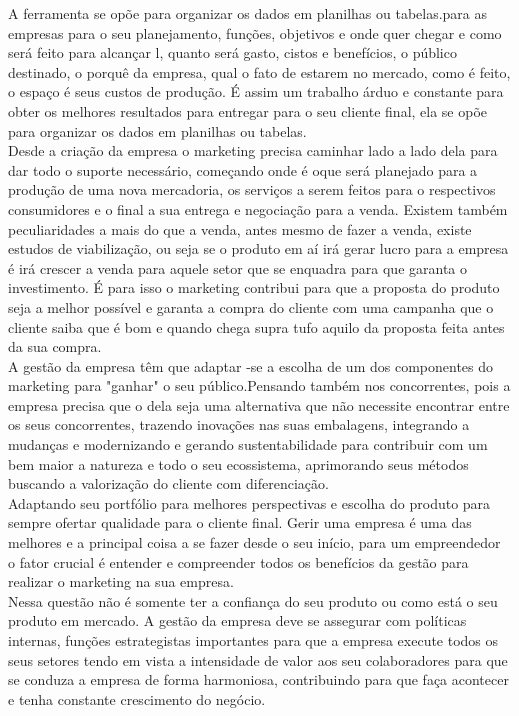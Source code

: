 \documentclass[a4paper,12pt]{article}
\begin{document}
   A ferramenta se opõe para organizar os dados em planilhas ou tabelas.para as empresas para o seu planejamento, funções, objetivos e onde quer chegar e como será feito para alcançar l, quanto será gasto, cistos e benefícios, o público destinado, o porquê da empresa, qual o fato de estarem no mercado, como é feito, o espaço é seus custos de produção. É assim um trabalho árduo e constante para obter os melhores resultados para entregar para o seu cliente final, ela se opõe para organizar os dados em planilhas ou tabelas.\\
   Desde a criação da empresa o marketing precisa caminhar lado a lado dela para dar todo o suporte necessário, começando onde é oque será  planejado para a produção de uma nova mercadoria, os serviços a serem feitos para o respectivos consumidores e o final a sua entrega e negociação para a venda. Existem também peculiaridades a mais do que a venda, antes mesmo de fazer a venda, existe estudos de viabilização, ou seja se o produto em aí irá gerar lucro para a empresa é irá crescer a venda para aquele setor que se enquadra para que garanta o investimento.
   É para isso o marketing contribui para que a proposta do produto seja  a melhor possível e garanta a compra do cliente com uma campanha que o cliente saiba que é bom e quando chega supra tufo aquilo da proposta feita antes da sua compra.\\
   A gestão da empresa têm que adaptar -se a escolha de um dos componentes do marketing para "ganhar" o seu público.Pensando também nos concorrentes, pois a empresa precisa que o dela seja uma alternativa que não necessite encontrar entre os seus concorrentes, trazendo inovações nas suas embalagens, integrando a mudanças e modernizando e gerando sustentabilidade para contribuir com um bem maior a natureza e todo o seu ecossistema, aprimorando seus métodos buscando a valorização do cliente com diferenciação.\\
   Adaptando seu portfólio para melhores perspectivas e escolha do produto para sempre ofertar qualidade para o cliente final.
   Gerir uma empresa é uma das melhores e a principal coisa a se fazer desde o seu início, para um empreendedor o fator crucial é entender e compreender todos os benefícios da gestão para realizar o marketing na sua empresa.\\
    Nessa questão não é somente ter a confiança do seu produto ou como está o seu produto em mercado.
   A gestão da empresa deve se assegurar com políticas internas, funções estrategistas importantes para que a empresa execute todos os seus setores tendo em vista a intensidade de valor aos seu colaboradores para que se conduza a empresa de forma harmoniosa,  contribuindo para que faça acontecer e tenha constante crescimento do negócio.\\
\end{document}

